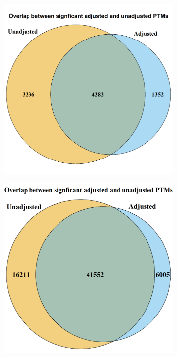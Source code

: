 \documentclass[mcp]{article}
\numberwithin{table}{section}
\begin{document}
\begin{figure}[ht]
\centering
\begin{subfigure}[c]{0.5\linewidth}
\includegraphics[width=1\textwidth]{images/ipah_venn_diagramm.png}
\caption{}
\label{fig:data4_venn_diagram}
\end{subfigure}
\begin{subfigure}[c]{0.5\linewidth}
\includegraphics[width=1\textwidth]{images/shig_venn_diagramm.png}

\end{subfigure}
\end{figure}
\end{document}
